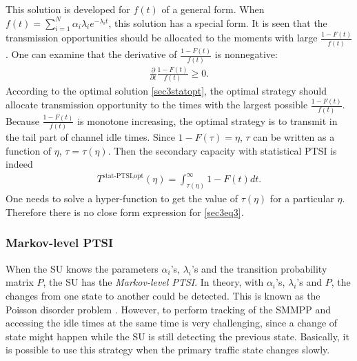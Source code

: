 \documentclass[10pt,final,journal,letterpaper]{IEEEtran}
\begin{document}
This solution is developed for $f(t)$ of a general form. When $f(t)=\sum_{i=1}^{N}\alpha_i\lambda_ie^{-\lambda_it}$, this solution has a special form. It is seen that the transmission opportunities should be allocated to the moments with large $\frac{1-F(t)}{f(t)}$. One can examine that the derivative of $\frac{1-F(t)}{f(t)}$ is nonnegative:
\begin{align}
    \frac{\partial}{\partial t}\frac{1-F(t)}{f(t)}\geq 0.\nonumber
\end{align}
According to the optimal solution \eqref{sec3statopt}, the optimal strategy should allocate transmission opportunity to the times with the largest possible $\frac{1-F(t)}{f(t)}$. Because $\frac{1-F(t)}{f(t)}$ is monotone increasing, the optimal strategy is to transmit in the tail part of channel idle times. Since $1-F(\tau)=\eta$, $\tau$ can be written as a function of $\eta$, $\tau=\tau(\eta)$. Then the secondary capacity with statistical PTSI is indeed
\begin{align}\label{sec3eq3}
    T^{\text{stat-PTSI,opt}}(\eta)=\int_{\tau(\eta)}^{\infty}1-F(t)dt.
\end{align}
One needs to solve a hyper-function to get the value of $\tau(\eta)$ for a particular $\eta$. Therefore there is no close form expression for \eqref{sec3eq3}.

\subsubsection{Markov-level PTSI}
When the SU knows the parameters $\alpha_i$'s, $\lambda_i$'s and the transition probability matrix $P$, the SU has the \emph{Markov-level PTSI}. In theory, with $\alpha_i$'s, $\lambda_i$'s and $P$, the changes from one state to another could be detected. This is known as the Poisson disorder problem \cite{peskir2002solving}. However, to perform tracking of the SMMPP and accessing the idle times at the same time is very challenging, since a change of state might happen while the SU is still detecting the previous state. Basically, it is possible to use this strategy when the primary traffic state changes slowly.
\end{document}
